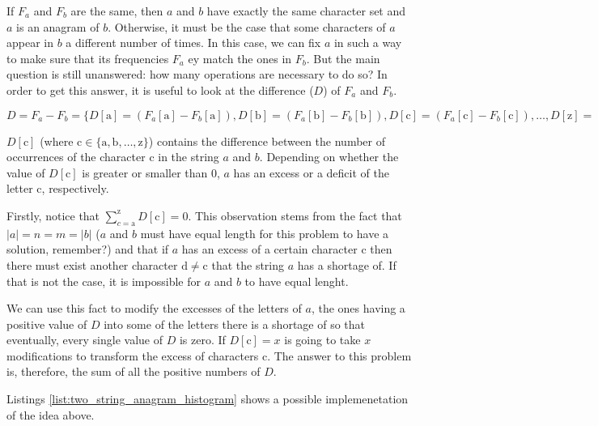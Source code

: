 If $F_a$ and $F_b$ are the same, then $a$ and $b$ have exactly the same character set and $a$ is an anagram of $b$.
Otherwise, it must be the case that some characters of $a$ appear in $b$ a different number of times.
In this case, we can fix $a$ in such a way to make sure that its frequencies $F_a$ ey match the ones in $F_b$. 
But the main question is still unanswered: how many operations are necessary to do so?  In order to get this answer, it is useful to look at
the difference ($D$) of $F_a$ and $F_b$.

$D = F_a - F_b = \{D[\mathrm{a}] = (F_a[\mathrm{a}] - F_b[\mathrm{a}]), D[\mathrm{b}] = (F_a[\mathrm{b}] - F_b[\mathrm{b}]), D[\mathrm{c}] = (F_a[\mathrm{c}] - F_b[\mathrm{c}]), \ldots, D[\mathrm{z}] = (F_a[\mathrm{z}] - F_b[\mathrm{z}])\}
$

$D[\mathrm{c}]$ (where $\mathrm{c} \in \{\mathrm{a},\mathrm{b},\ldots,\mathrm{z}\}$) contains the difference between the number of occurrences of the character $\mathrm{c}$ in the string $a$ and $b$. Depending on whether the value of $D[\mathrm{c}]$  is greater or smaller than $0$, $a$ has an excess or a deficit of the letter c, respectively.

Firstly, notice that $\sum_{c=\mathrm{a}}^{\mathrm{z}} D[\mathrm{c}] = 0$. This observation stems from the fact that $|a|=n=m=|b|$ ($a$ and $b$ must have equal length for this problem to have a solution, remember?) and that if $a$ has an excess of a certain character $\mathrm{c}$ then there must exist another character $\mathrm{d} \neq \mathrm{c}$ that the string $a$ has a shortage of. If that is not the case, it is impossible for $a$ and $b$ to have equal lenght.

We can use this fact to modify the excesses of the letters of $a$, the ones having a positive value of $D$ 
into some of the letters there is a shortage of so that eventually, every single value of $D$ is zero.
If $D[\mathrm{c}] = x$ is going to take $x$ modifications to transform the excess of characters $\mathrm{c}$.
The answer to this problem is, therefore, the sum of all the positive numbers of $D$. 

Listings \ref{list:two_string_anagram_histogram} shows a possible implemenetation of the idea above.




